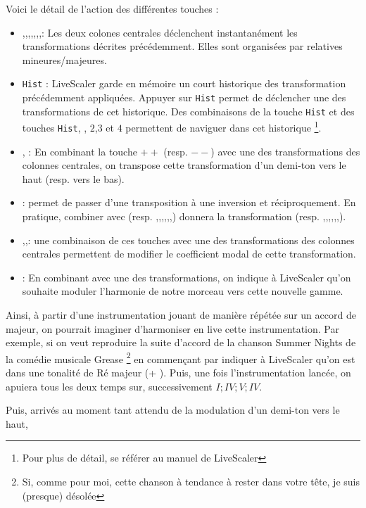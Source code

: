 Voici le détail de l'action des différentes touches : 
\begin{itemize}
  \item \LSI,\LSvi,\LSIV,\LSII,\LSV,\LSiii,\LSII,\LSvii :  Les deux colones centrales déclenchent instantanément les transformations décrites précédemment. Elles sont organisées par relatives mineures/majeures.
  \item \texttt{Hist} : LiveScaler garde en mémoire un court historique des transformation précédemment appliquées. Appuyer sur \texttt{Hist} permet de déclencher une des transformations de cet historique. Des combinaisons de la touche \texttt{Hist} et des touches \texttt{Hist}, \LSMm, $2$,$3$ et $4$ permettent de naviguer dans cet historique \footnote{Pour plus de détail, se référer au manuel de LiveScaler}. 
  \item \LSpp, \LSmm : En combinant la touche $++$ (resp. $--$) avec une des transformations des colonnes centrales, on transpose cette transformation d'un demi-ton vers le haut (resp. vers le bas). 
  \item  \LSMm : permet de passer d'une transposition à une inversion et réciproquement. En pratique, combiner \LSMm avec \LSI (resp. \LSvi,\LSIV,\LSII,\LSV,\LSiii,\LSII,\LSvii) donnera la transformation \LSI (resp. \LSvi,\LSIV,\LSII,\LSV,\LSiii,\LSII,\LSvii).
  \item \LStwo,\LSthree,\LSfour : une combinaison de ces touches avec une des transformations des colonnes centrales permettent de modifier le coefficient modal de cette transformation.
  \item \LSMod : En combinant \LSMod avec une des transformations, on indique à LiveScaler qu'on souhaite moduler l'harmonie de notre morceau vers cette nouvelle gamme. 
\end{itemize}

Ainsi, à partir d'une instrumentation jouant de manière répétée sur un accord de  majeur, on pourrait imaginer d'harmoniser en live cette instrumentation. Par exemple, si on veut reproduire la suite d'accord de la chanson Summer Nights de la comédie musicale Grease \footnote{Si, comme pour moi, cette chanson à tendance à rester dans votre tête, je suis (presque) désolée} en commençant par indiquer à LiveScaler qu'on est dans une tonalité de Ré majeur (\LSMod + \LSII). Puis, une fois l'instrumentation lancée, on apuiera tous les deux temps sur, successivement $I ; IV ; V ; IV$.

Puis, arrivés au moment tant attendu de la modulation d'un demi-ton vers le haut,

